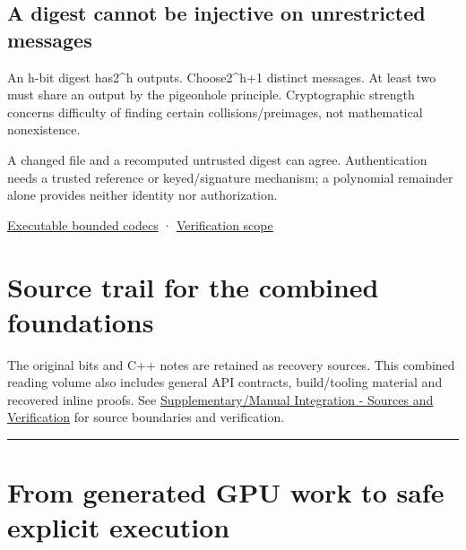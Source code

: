 \subsection{A digest cannot be injective on unrestricted messages}\label{01-foundations-i-ch011-a-digest-cannot-be-injective-on-unrestricted-messages}

\hypertarget{01-foundations-i-ch011-a-digest-cannot-be-injective-on-unrestricted-messages}{}

An h-bit digest has2\^{}h outputs. Choose2\^{}h+1 distinct messages. At least two must share an output by the pigeonhole principle. Cryptographic strength concerns difficulty of finding certain collisions/preimages, not mathematical nonexistence.

A changed file and a recomputed untrusted digest can agree. Authentication needs a trusted reference or keyed/signature mechanism; a polynomial remainder alone provides neither identity nor authorization.

\hyperref[appendix-4e2236f53445-representation-codecs-and-bounded-file-laboratory]{Executable bounded codecs} · \hyperref[appendix-a103e7846d21]{Verification scope}

\section{Source trail for the combined foundations}\label{01-foundations-i-ch011-source-trail-for-the-combined-foundations}

\hypertarget{01-foundations-i-ch011-source-trail-for-the-combined-foundations}{}

The original bits and C++ notes are retained as recovery sources. This combined reading volume also includes general API contracts, build/tooling material and recovered inline proofs. See \hyperref[appendix-3b67654799a2]{Supplementary/Manual Integration - Sources and Verification} for source boundaries and verification.

\begin{center}\rule{0.5\linewidth}{0.5pt}\end{center}

\section{From generated GPU work to safe explicit execution}\label{01-foundations-i-ch011-from-generated-gpu-work-to-safe-explicit-execution}

\hypertarget{01-foundations-i-ch011-from-generated-gpu-work-to-safe-explicit-execution}{}

